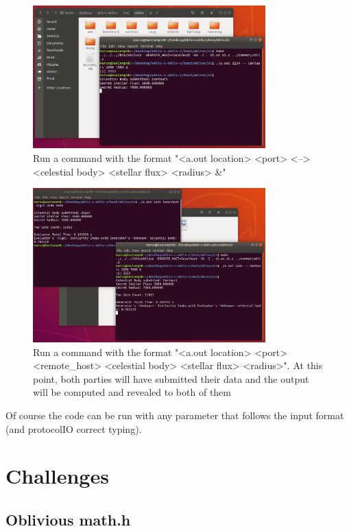 \documentclass[a4paper]{article}
\begin{document}
\begin{figure}[H]
  \centering
  \includegraphics[width=0.8\textwidth]{generator.png}
  \caption{Run a command with the format "<a.out location> <port> <--> <celestial body> <stellar flux> <radius> \&"}
\end{figure}

\begin{figure}[H]
  \centering
  \includegraphics[width=0.8\textwidth]{evaluator.png}
  \caption{Run a command with the format "<a.out location> <port> <remote\_host> <celestial body> <stellar flux> <radius>". At this point, both parties will have submitted their data and the output will be computed and revealed to both of them}
\end{figure}

Of course the code can be run with any parameter that follows the input format (and protocolIO correct typing).

\section{Challenges}

\subsection{Oblivious math.h}
\end{document}
